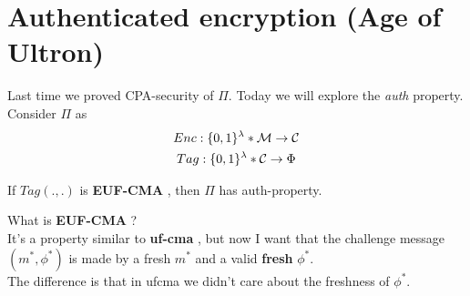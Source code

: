 \section{Authenticated encryption (Age of Ultron)}
Last time we proved CPA-security of $\Pi$. Today we will explore the
\textit{auth}  property.
Consider $\Pi$ as
    \begin{gather*}
        Enc:\{0,1\}^{\lambda}*\mathcal{M} \to \mathcal{C} \\
        Tag:\{0,1\}^{\lambda}*\mathcal{C} \to \Phi 
    \end{gather*}
   
    \begin{lemma}
        If $Tag(.,.)$ is \textbf{EUF-CMA} , then $\Pi$ has
    auth-property. 
    \end{lemma}
    
    What is \textbf{EUF-CMA} ?\\ 
    It's a property similar to \textbf{uf-cma} ,
    but now I want that the challenge message $(m^{*}, \phi^{*})$ is made by a
    fresh $m^{*}$ and a valid \textbf{fresh} $\phi^{*}$.\\ 
    The difference is that in ufcma we didn't care about the freshness of
    $\phi^{*}$.

